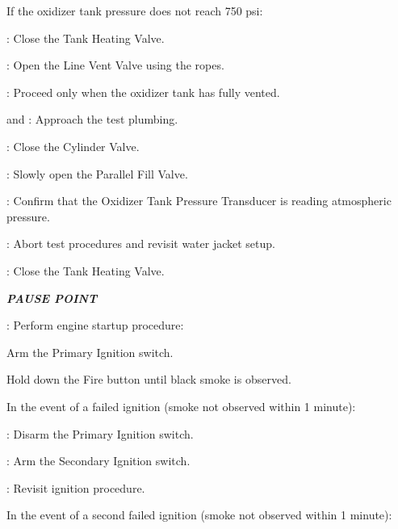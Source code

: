 \begin{checklist}
    \begin{checklist}[label=$\bullet$]
        \item If the oxidizer tank pressure does not reach 750 psi:
        \begin{checklist}
            \item \heat: Close the Tank Heating Valve.
            \item \primary{}: Open the Line Vent Valve using the ropes.
            \item \secondary: Proceed only when the oxidizer tank has fully vented.
            \item \primary{} and \secondary: Approach the test plumbing.
            \item \primary{}: Close the Cylinder Valve.
            \item \primary{}: Slowly open the Parallel Fill Valve.
            \item \daq{}: Confirm that the Oxidizer Tank Pressure Transducer is reading atmospheric pressure.
            \item \ops{}: Abort test procedures and revisit water jacket setup.
        \end{checklist}
    \end{checklist}
    \item \heat: Close the Tank Heating Valve.
    \item \textbf{\textit{PAUSE POINT}}
    \item \primary{}: Perform engine startup procedure:
    \begin{checklist}
        \item Arm the Primary Ignition switch.
        \item Hold down the Fire button until black smoke is observed.
        \begin{checklist}[label=$\bullet$]
            \item In the event of a failed ignition (smoke not observed within 1 minute):
            \begin{checklist}
                \item \primary: Disarm the Primary Ignition switch.
                \item \primary: Arm the Secondary Ignition switch.
                \item \ops: Revisit ignition procedure.
            \end{checklist}
            \item In the event of a second failed ignition (smoke not observed within 1 minute):

\end{checklist}
\end{checklist}
\end{checklist}
